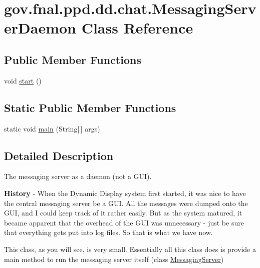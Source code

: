 \hypertarget{classgov_1_1fnal_1_1ppd_1_1dd_1_1chat_1_1MessagingServerDaemon}{\section{gov.\-fnal.\-ppd.\-dd.\-chat.\-Messaging\-Server\-Daemon Class Reference}
\label{classgov_1_1fnal_1_1ppd_1_1dd_1_1chat_1_1MessagingServerDaemon}
}
\subsection*{Public Member Functions}
\begin{DoxyCompactItemize}
\item 
void \hyperlink{classgov_1_1fnal_1_1ppd_1_1dd_1_1chat_1_1MessagingServerDaemon_a00cbd9c8eec08febc8d4c8baba8bf5fd}{start} ()
\end{DoxyCompactItemize}
\subsection*{Static Public Member Functions}
\begin{DoxyCompactItemize}
\item 
static void \hyperlink{classgov_1_1fnal_1_1ppd_1_1dd_1_1chat_1_1MessagingServerDaemon_a00c5f81d7957dbba0fe6ef52b10d21f0}{main} (String\mbox{[}$\,$\mbox{]} args)
\end{DoxyCompactItemize}


\subsection{Detailed Description}
The messaging server as a daemon (not a G\-U\-I). 

{\bfseries History} -\/ When the Dynamic Display system first started, it was nice to have the central messaging server be a G\-U\-I. All the messages were dumped onto the G\-U\-I, and I could keep track of it rather easily. But as the system matured, it became apparent that the overhead of the G\-U\-I was unnecessary -\/ just be sure that everything gets put into log files. So that is what we have now. 

This class, as you will see, is very small. Essentially all this class does is provide a main method to run the messaging server itself (class \hyperlink{classgov_1_1fnal_1_1ppd_1_1dd_1_1chat_1_1MessagingServer}{Messaging\-Server})

